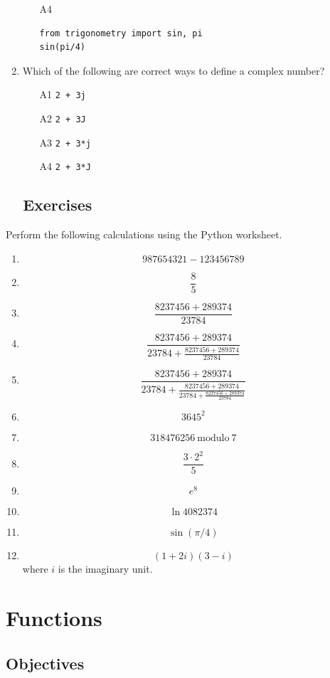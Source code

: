 \begin{enumerate}
\begin{enumerate}
\item[A4] 
\begin{verbatim}
from trigonometry import sin, pi
sin(pi/4)
\end{verbatim}
\end{enumerate}
\item Which of the following are correct ways to define a complex number?
\begin{enumerate}
\item[A1] {\tt 2 + 3j}
\item[A2] {\tt 2 + 3J}
\item[A3] {\tt 2 + 3*j}
\item[A4] {\tt 2 + 3*J}
\end{enumerate}
\end{enumerate}

\subsection{\ \ Exercises}
Perform the following calculations using the Python worksheet.
\begin{enumerate}
\item 
$$
  987654321 - 123456789
$$
\item 
$$
\frac{8}{5}
$$
\item 
$$
  \frac{8237456 + 289374}{23784}
$$ 
\item 
$$
  \frac{8237456 + 289374}{23784 + \frac{8237456 + 289374}{23784}}
$$ 
\item 
$$
  \frac{8237456 + 289374}{23784 + \frac{8237456 + 289374}{23784 + \frac{8237456 + 289374}{23784}}}
$$ 
\item 
$$
  3645^2
$$
\item 
$$
  318476256 \ \mbox{modulo} \ 7
$$
\item 
$$
  \frac{3\cdot 2^2}{5} 
$$
\item 
$$
  e^8
$$
\item 
$$
  \ln 4082374
$$
\item 
$$
  \sin(\pi / 4)
$$
\item 
$$
  (1 + 2i)(3 - i)
$$
where $i$ is the imaginary unit.
\end{enumerate}

\section{Functions}

\subsection{Objectives}

